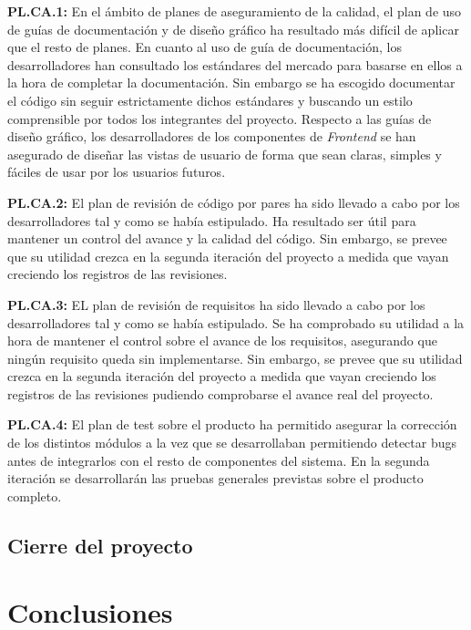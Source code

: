 \documentclass{article}
\begin{document}
\pagebreak
 
\textbf{PL.CA.1:}
En el ámbito de planes de aseguramiento de la calidad, el plan de uso de guías de documentación y de diseño gráfico ha resultado más difícil de aplicar que el resto de planes. En cuanto al uso de guía de documentación, los desarrolladores han consultado los estándares del mercado para basarse en ellos a la hora de completar la documentación. Sin embargo se ha escogido documentar el código sin seguir estrictamente dichos estándares y buscando un estilo comprensible por todos los integrantes del proyecto. Respecto a las guías de diseño gráfico, los desarrolladores de los componentes de \textit{Frontend} se han asegurado de diseñar las vistas de usuario de forma que sean claras, simples y fáciles de usar por los usuarios futuros.
 
\textbf{PL.CA.2:}
El plan de revisión de código por pares ha sido llevado a cabo por los desarrolladores tal y como se había estipulado. Ha resultado ser útil para mantener un control del avance y la calidad del código. Sin embargo, se prevee que su utilidad crezca en la segunda iteración del proyecto a medida que vayan creciendo los registros de las revisiones.
 
\textbf{PL.CA.3:}
EL plan de revisión de requisitos ha sido llevado a cabo por los desarrolladores tal y como se había estipulado.
Se ha comprobado su utilidad a la hora de mantener el control sobre el avance de los requisitos, asegurando que ningún requisito queda sin implementarse. Sin embargo, se prevee que su utilidad crezca en la segunda iteración del proyecto a medida que vayan creciendo los registros de las revisiones pudiendo comprobarse el avance real del proyecto.
 
\textbf{PL.CA.4:}
El plan de test sobre el producto ha permitido asegurar la corrección de los distintos módulos a la vez que se desarrollaban permitiendo detectar bugs antes de integrarlos con el resto de componentes del sistema. En la segunda iteración se desarrollarán las pruebas generales previstas sobre el producto completo.
 
 
\subsection{Cierre del proyecto}
 
\section*{Conclusiones}
 
\end{document}
